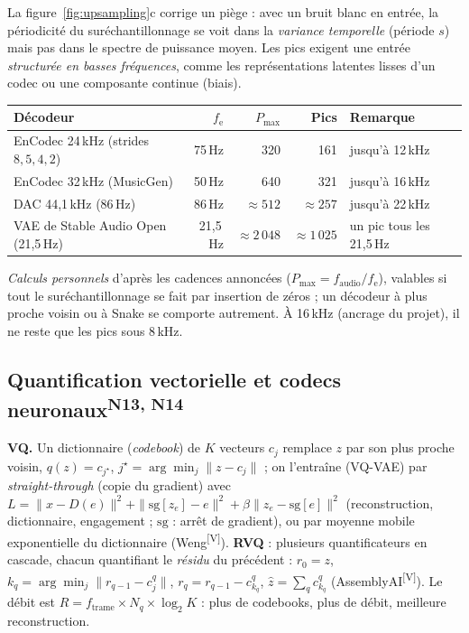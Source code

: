 \documentclass[10pt,a4paper]{article}
\newcommand{\sV}{\textsuperscript{\scriptsize\textcolor{green!40!black}{[V]}}}
\newcommand{\nref}[1]{\textsuperscript{\scriptsize\textcolor{black!55}{#1}}}
\begin{document}
La figure~\ref{fig:upsampling}c corrige un piège : avec un bruit blanc en entrée, la périodicité du suréchantillonnage se voit dans la \emph{variance temporelle} (période $s$) mais pas dans le spectre de puissance moyen. Les pics exigent une entrée \emph{structurée en basses fréquences}, comme les représentations latentes lisses d'un codec ou une composante continue (biais).

\begin{center}\footnotesize
\begin{tabularx}{\textwidth}{@{}L{4.6cm}rrrX@{}}
\toprule
\textbf{Décodeur} & $f_{\mathrm e}$ & $P_{\max}$ & \textbf{Pics} & \textbf{Remarque}\\
\midrule
EnCodec 24\,kHz (strides $8,5,4,2$) & 75\,Hz & 320 & 161 & jusqu'à 12\,kHz\\
EnCodec 32\,kHz (MusicGen) & 50\,Hz & 640 & 321 & jusqu'à 16\,kHz\\
DAC 44,1\,kHz (86\,Hz) & 86\,Hz & $\ensuremath{\approx}512$ & $\ensuremath{\approx}257$ & jusqu'à 22\,kHz\\
VAE de Stable Audio Open (21,5\,Hz) & 21,5\,Hz & $\ensuremath{\approx}2\,048$ & $\ensuremath{\approx}1\,025$ & un pic tous les 21,5\,Hz\\
\bottomrule
\end{tabularx}
\end{center}
\emph{Calculs personnels} d'après les cadences annoncées ($P_{\max}=f_{\mathrm{audio}}/f_{\mathrm e}$), valables si tout le suréchantillonnage se fait par insertion de zéros ; un décodeur à plus proche voisin ou à Snake se comporte autrement. À 16\,kHz (ancrage du projet), il ne reste que les pics sous 8\,kHz.

\subsection{Quantification vectorielle et codecs neuronaux\nref{N13, N14}}\label{sec:codecs}
\textbf{VQ.} Un dictionnaire (\emph{codebook}) de $K$ vecteurs $c_j$ remplace $z$ par son plus proche voisin, $q(z)=c_{j^\star}$, $j^\star=\arg\min_j\|z-c_j\|$ ; on l'entraîne (VQ-VAE) par \emph{straight-through} (copie du gradient) avec $L=\|x-D(e)\|^2+\|\mathrm{sg}[z_e]-e\|^2+\beta\|z_e-\mathrm{sg}[e]\|^2$ (reconstruction, dictionnaire, engagement ; $\mathrm{sg}$ : arrêt de gradient), ou par moyenne mobile exponentielle du dictionnaire (Weng\sV). \textbf{RVQ} : plusieurs quantificateurs en cascade, chacun quantifiant le \emph{résidu} du précédent : $r_0=z$, $k_q=\arg\min_j\|r_{q-1}-c^q_j\|$, $r_q=r_{q-1}-c^q_{k_q}$, $\hat z=\sum_q c^q_{k_q}$ (AssemblyAI\sV). Le débit est $R=f_{\mathrm{trame}}\times N_q\times\log_2K$ : plus de codebooks, plus de débit, meilleure reconstruction.
\end{document}
